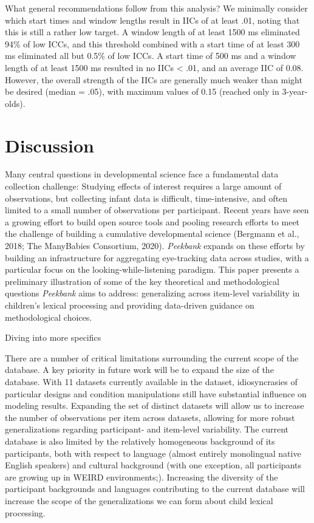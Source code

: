 \documentclass[10pt, letterpaper]{article}
\begin{document}
What general recommendations follow from this analysis? We minimally
consider which start times and window lengths result in IICs of at least
.01, noting that this is still a rather low target. A window length of
at least 1500 ms eliminated 94\% of low ICCs, and this threshold
combined with a start time of at least 300 ms eliminated all but 0.5\%
of low ICCs. A start time of 500 ms and a window length of at least 1500
ms resulted in no IICs \textless{} .01, and an average IIC of 0.08.
However, the overall strength of the IICs are generally much weaker than
might be desired (median = .05), with maximum values of 0.15 (reached
only in 3-year-olds).

\hypertarget{discussion}{%
\section{Discussion}\label{discussion}}

Many central questions in developmental science face a fundamental data
collection challenge: Studying effects of interest requires a large
amount of observations, but collecting infant data is difficult,
time-intensive, and often limited to a small number of observations per
participant. Recent years have seen a growing effort to build open
source tools and pooling research efforts to meet the challenge of
building a cumulative developmental science (Bergmann et al., 2018; The
ManyBabies Consortium, 2020). \emph{Peekbank} expands on these efforts
by building an infrastructure for aggregating eye-tracking data across
studies, with a particular focus on the looking-while-listening
paradigm. This paper presents a preliminary illustration of some of the
key theoretical and methodological questions \emph{Peekbank} aims to
address: generalizing across item-level variability in children's
lexical processing and providing data-driven guidance on methodological
choices.

Diving into more specifics

There are a number of critical limitations surrounding the current scope
of the database. A key priority in future work will be to expand the
size of the database. With 11 datasets currently available in the
dataset, idiosyncrasies of particular designs and condition
manipulations still have substantial influence on modeling results.
Expanding the set of distinct datasets will allow us to increase the
number of observations per item across datasets, allowing for more
robust generalizations regarding participant- and item-level
variability. The current database is also limited by the relatively
homogeneous background of its participants, both with respect to
language (almost entirely monolingual native English speakers) and
cultural background (with one exception, all participants are growing up
in WEIRD environments;). Increasing the diversity of the participant
backgrounds and languages contributing to the current database will
increase the scope of the generalizations we can form about child
lexical processing.
\end{document}
